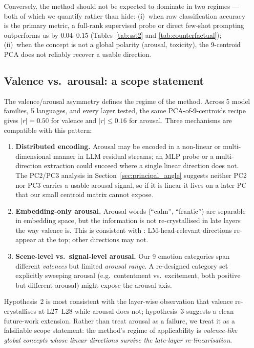 Conversely, the method should not be expected to dominate in two
regimes --- both of which we quantify rather than hide:
(i)~when raw classification accuracy is the primary metric, a full-rank
supervised probe or direct few-shot prompting outperforms us by
$0.04$--$0.15$ (Tables~\ref{tab:sst2} and \ref{tab:counterfactual});
(ii)~when the concept is not a global polarity (arousal, toxicity), the
9-centroid PCA does not reliably recover a usable direction.

\subsection{Valence vs.\ arousal: a scope statement}

The valence/arousal asymmetry defines the regime of the method. Across 5
model families, 5 languages, and every layer tested, the same PCA-of-9-centroids
recipe gives $|r|=0.50$ for valence and $|r|\leq 0.16$ for arousal. Three
mechanisms are compatible with this pattern:

\begin{enumerate}[leftmargin=*]
\item \textbf{Distributed encoding.} Arousal may be encoded in a
non-linear or multi-dimensional manner in LLM residual streams; an
MLP probe or a multi-direction extraction could succeed where a single
linear direction does not. The PC2/PC3 analysis in
Section~\ref{sec:principal_angle} suggests neither PC2 nor PC3 carries
a usable arousal signal, so if it is linear it lives on a later PC
that our small centroid matrix cannot expose.
\item \textbf{Embedding-only arousal.} Arousal words (``calm'',
``frantic'') are separable in embedding space, but the information is
not re-crystallised in late layers the way valence is. This is
consistent with \cite{park2024linear}: LM-head-relevant directions
re-appear at the top; other directions may not.
\item \textbf{Scene-level vs.\ signal-level arousal.} Our 9 emotion
categories span different \emph{valences} but limited \emph{arousal
range}. A re-designed category set explicitly sweeping arousal
(e.g.\ contentment vs.\ excitement, both positive but different
arousal) might expose the arousal axis.
\end{enumerate}

Hypothesis~2 is most consistent with the layer-wise observation that
valence re-crystallises at L27--L28 while arousal does not; hypothesis~3
suggests a clean future-work extension. Rather than treat arousal as a
failure, we treat it as a falsifiable scope statement: the method's
regime of applicability is \emph{valence-like global concepts whose
linear directions survive the late-layer re-linearisation}.

